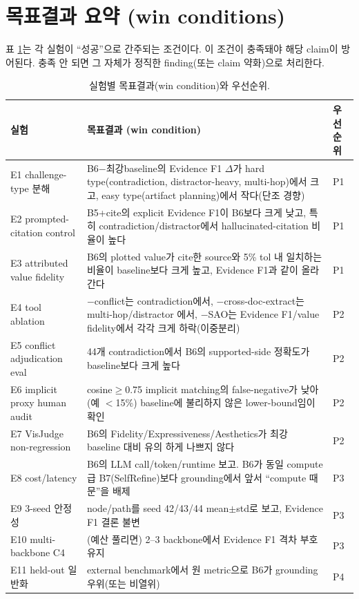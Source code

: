 \documentclass[11pt]{article}
\begin{document}
\section{목표결과 요약 (win conditions)}

표 \ref{tab:targets}는 각 실험이 ``성공''으로 간주되는 조건이다. 이 조건이 충족돼야 해당 claim이
방어된다. 충족 안 되면 그 자체가 정직한 finding(또는 claim 약화)으로 처리한다.

\begin{table}[h]
\centering
\small
\begin{tabular}{p{3.2cm} p{8.5cm} p{1.6cm}}
\toprule
실험 & 목표결과 (win condition) & 우선순위 \\
\midrule
E1 challenge-type 분해 & B6$-$최강baseline의 Evidence F1 $\Delta$가 hard type(contradiction,
distractor-heavy, multi-hop)에서 크고, easy type(artifact planning)에서 작다(단조 경향) & P1 \\
E2 prompted-citation control & B5+cite의 explicit Evidence F1이 B6보다 크게 낮고, 특히
contradiction/distractor에서 hallucinated-citation 비율이 높다 & P1 \\
E3 attributed value fidelity & B6의 plotted value가 cite한 source와 5\% tol 내 일치하는 비율이
baseline보다 크게 높고, Evidence F1과 같이 올라간다 & P1 \\
E4 tool ablation & $-$conflict는 contradiction에서, $-$cross-doc-extract는 multi-hop/distractor
에서, $-$SAO는 Evidence F1/value fidelity에서 각각 크게 하락(이중분리) & P2 \\
E5 conflict adjudication eval & 44개 contradiction에서 B6의 supported-side 정확도가 baseline보다
크게 높다 & P2 \\
E6 implicit proxy human audit & cosine$\geq$0.75 implicit matching의 false-negative가 낮아
(예 $<$15\%) baseline에 불리하지 않은 lower-bound임이 확인 & P2 \\
E7 VisJudge non-regression & B6의 Fidelity/Expressiveness/Aesthetics가 최강 baseline 대비 유의
하게 나쁘지 않다 & P2 \\
E8 cost/latency & B6의 LLM call/token/runtime 보고. B6가 동일 compute급 B7(SelfRefine)보다
grounding에서 앞서 ``compute 때문''을 배제 & P3 \\
E9 3-seed 안정성 & node/path를 seed 42/43/44 mean$\pm$std로 보고, Evidence F1 결론 불변 & P3 \\
E10 multi-backbone C4 & (예산 풀리면) 2--3 backbone에서 Evidence F1 격차 부호 유지 & P3 \\
E11 held-out 일반화 & external benchmark에서 원 metric으로 B6가 grounding 우위(또는 비열위) & P4 \\
\bottomrule
\end{tabular}
\caption{실험별 목표결과(win condition)와 우선순위.}
\label{tab:targets}
\end{table}
\end{document}
